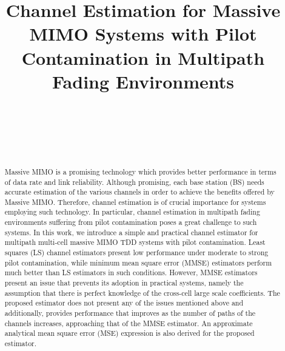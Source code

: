 \documentclass[journal,12pt,onecolumn]{IEEEtran}
\begin{document}
\IEEEoverridecommandlockouts

\title{Channel Estimation for Massive MIMO Systems with Pilot Contamination in Multipath Fading Environments}

\author{
 \\
 \\
 \\
 \\
}

\maketitle

\begin{abstract}
Massive MIMO is a promising technology which provides better performance in terms of data rate and link reliability. Although promising, each base station (BS) needs accurate estimation of the various channels in order to achieve the benefits offered by Massive MIMO. Therefore, channel estimation is of crucial importance for systems employing such technology. In particular, channel estimation in multipath fading environments suffering from pilot contamination poses a great challenge to such systems. In this work, we introduce a simple and practical channel estimator for multipath multi-cell massive MIMO TDD systems with pilot contamination. Least squares (LS) channel estimators present low performance under moderate to strong pilot contamination, while minimum mean square error (MMSE) estimators perform much better than LS estimators in such conditions. However, MMSE estimators present an issue that prevents its adoption in practical systems, namely the assumption that there is perfect knowledge of the cross-cell large scale coefficients. The proposed estimator does not present any of the issues mentioned above and additionally, provides performance that improves as the number of paths of the channels increases, approaching that of the MMSE estimator. An approximate analytical mean square error (MSE) expression is also derived for the proposed estimator.
\end{abstract}
\end{document}
